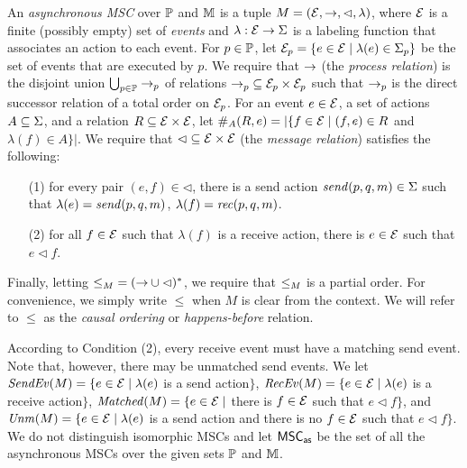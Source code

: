 \documentclass{article}
\begin{document}
\begin{definition}
An \emph{asynchronous MSC} over $\Procs$ and $\Msg$ is a tuple $\msc = (\Events,\procrel,\lhd,\lambda)$, where $\Events$ is a finite (possibly empty) set of \emph{events} and $\lambda: \Events \to \Act$ is a labeling function that associates an action to each event. For $p \in \Procs$, let $\Events_p = \{e \in \Events \mid \lambda(e) \in \pAct{p}\}$ be the set of events that are executed by $p$. We require that $\procrel$ (the \emph{process relation}) is the disjoint union $\bigcup_{p \in \Procs} \procrel_p$ of relations ${\procrel_p} \subseteq \Events_p \times \Events_p$ such that $\procrel_p$ is the direct successor relation of a total order on $\Events_p$. For an event $e \in \Events$, a set of actions $A \subseteq \Act$, and a relation $\rel \subseteq \Events \times \Events$,
let $\sametype{e}{A}{\rel} = |\{f \in \Events \mid (f,e) \in \rel$ and $\lambda(f) \in A\}|$. We require that ${\lhd} \subseteq \Events \times \Events$ (the \emph{message relation}) satisfies the following:
\begin{itemize}\itemsep=0.5ex
\item[(1)] for every pair $(e,f) \in {\lhd}$, there is a send action $\sact{p}{q}{\msg} \in \Act$ such that $\lambda(e) = \sact{p}{q}{\msg}$, $\lambda(f) = \ract{p}{q}{\msg}$.
\item[(2)] for all $f \in \Events$ such that $\lambda(f)$ is a receive action, there is $e \in \Events$ such that $e \lhd f$.
\end{itemize}
Finally, letting ${\le}_\msc = ({\procrel} \cup {\lhd})^\ast$,
we require that $\le_\msc$ is a partial order. For convenience, we simply write $\le$ when $M$ is clear from the context. We will refer to $\le$ as the \emph{causal ordering} or \emph{happens-before} relation.
\end{definition}

According to Condition (2), every receive event must have a matching send event. Note that, however, there may be unmatched send events.
We let
$\SendEv{\msc} = \{e \in \Events \mid \lambda(e)$ is a send
action$\}$,
$\RecEv{\msc} = \{e \in \Events \mid \lambda(e)$ is a receive
action$\}$,
$\Matched{\msc} = \{e \in \Events \mid$ there is $f \in \Events$
such that $e \lhd f\}$, and
$\Unm{\msc} = \{e \in \Events \mid \lambda(e)$ is a send
action and there is no $f \in \Events$ such that $e \lhd f\}$.
%
We do not distinguish isomorphic MSCs and
let $\asMSCs$ be the set of all the asynchronous MSCs over the given sets $\Procs$ and $\Msg$.
\end{document}

